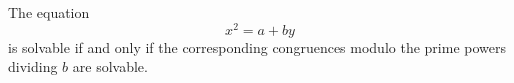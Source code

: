 \begin{proposition}
    The equation
\[
    x^2=a+by
\]
    is solvable if and only if the corresponding congruences modulo the prime powers dividing $b$ are solvable.
\end{proposition}
